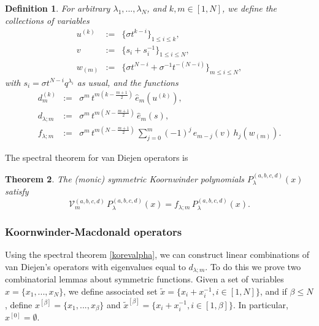 \documentclass[12pt]{amsart}
\newtheorem{thm}{Theorem}[section]
\newtheorem{defn}[thm]{Definition}
\numberwithin{equation}{section}
\begin{document}
\begin{defn}\label{ABCDeigen}
For arbitrary $\lambda_1,...,\lambda_N$, and $k,m\in [1,N]$, we define the collections of variables
\begin{eqnarray*}
u^{(k)}&:=&\{\sigma t^{k-i}\}_{1\leq i\leq k},\\
%
v&:=&\{ s_i+s_i^{-1}\}_{1\leq i\leq N},
%
\\
w_{(m)}&:=&\{ \sigma t^{N-i} +\sigma^{-1}t^{-(N-i)} \}_{m\leq i\leq N},
\end{eqnarray*}
with $s_i=\sigma t^{N-i} q^{\lambda_i}$ as usual,
and the functions
\begin{eqnarray}
d_{m}^{(k)}&:=&\sigma^m\,t^{m(k-\frac{m+1}{2})}\, {\hat e}_m(u^{(k)}),\label{Evalzero}\\
d_{\lambda;m}&:=& \sigma^m\,t^{m(N-\frac{m+1}{2})}\, {\hat e}_m(s),\label{Eval}\\
f_{\lambda;m}&:=& \sigma^m\,t^{m(N-\frac{m+1}{2})}\, \sum_{j=0}^m (-1)^j\, e_{m-j}(v)\, h_{j}(w_{(m)}) .\label{Fval} 
\end{eqnarray}
\end{defn}
%
%

%
The spectral theorem for van Diejen operators is
\begin{thm}\label{speckorthm}\cite{vandiej}
The (monic) symmetric Koornwinder polynomials $P_\lambda^{(a,b,c,d)}(x)$ satisfy
%
%
\begin{equation}\label{korevalpha}
{\mathcal V}_m^{(a,b,c,d)}\, P_\lambda^{(a,b,c,d)}(x) = f_{\lambda;m}\, P_\lambda^{(a,b,c,d)}(x) .
\end{equation}
\end{thm}




%
%
\subsubsection{Koornwinder-Macdonald operators}\label{MacKorsec}
\label{combsec}

Using the spectral theorem \ref{korevalpha}, we can construct  linear combinations of van Diejen's operators with eigenvalues  equal to $d_{\lambda;m}$. To do this we prove two combinatorial lemmas about symmetric functions.
 Given a set of variables $x=\{x_1,...,x_N\}$, we define associated set
${\tilde x}=\{x_i+x_i^{-1}, i\in[1,N]\}$,  and if $\beta\leq N$, define $x^{[\beta]}=\{x_1,...,x_{\beta}\}$ and $\tilde x^{[\beta]} = \{x_i+x_i^{-1}, i\in [1,\beta]\}$. In particular, $x^{[0]}=\emptyset$.
\end{document}
